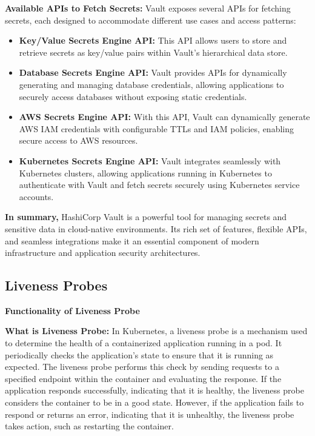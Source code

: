 \textbf{Available APIs to Fetch Secrets:}
Vault exposes several APIs for fetching secrets, each designed to accommodate different use cases and access patterns:

\begin{itemize}
    \item \textbf{Key/Value Secrets Engine API:} This API allows users to store and retrieve secrets as key/value pairs within Vault's hierarchical data store.
    
    \item \textbf{Database Secrets Engine API:} Vault provides APIs for dynamically generating and managing database credentials, allowing applications to securely access databases without exposing static credentials.
    
    \item \textbf{AWS Secrets Engine API:} With this API, Vault can dynamically generate AWS IAM credentials with configurable TTLs and IAM policies, enabling secure access to AWS resources.
    
    \item \textbf{Kubernetes Secrets Engine API:} Vault integrates seamlessly with Kubernetes clusters, allowing applications running in Kubernetes to authenticate with Vault and fetch secrets securely using Kubernetes service accounts.
\end{itemize}

\textbf{In summary,} HashiCorp Vault is a powerful tool for managing secrets and sensitive data in cloud-native environments. Its rich set of features, flexible APIs, and seamless integrations make it an essential component of modern infrastructure and application security architectures.

\subsection{Liveness Probes}

\textbf{Functionality of Liveness Probe}

\textbf{What is Liveness Probe:}
In Kubernetes, a liveness probe is a mechanism used to determine the health of a containerized application running in a pod. It periodically checks the application's state to ensure that it is running as expected. The liveness probe performs this check by sending requests to a specified endpoint within the container and evaluating the response. If the application responds successfully, indicating that it is healthy, the liveness probe considers the container to be in a good state. However, if the application fails to respond or returns an error, indicating that it is unhealthy, the liveness probe takes action, such as restarting the container.


